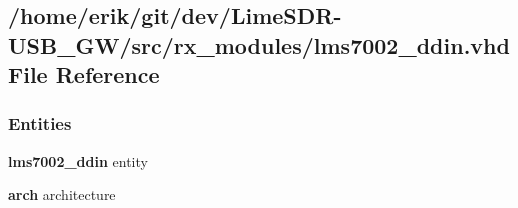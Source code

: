 \subsection{/home/erik/git/dev/\+Lime\+S\+D\+R-\/\+U\+S\+B\+\_\+\+G\+W/src/rx\+\_\+modules/lms7002\+\_\+ddin.vhd File Reference}
\label{rx__modules_2lms7002__ddin_8vhd}
\subsubsection*{Entities}
\begin{DoxyCompactItemize}
\item 
{\bf lms7002\+\_\+ddin} entity
\item 
{\bf arch} architecture
\end{DoxyCompactItemize}
